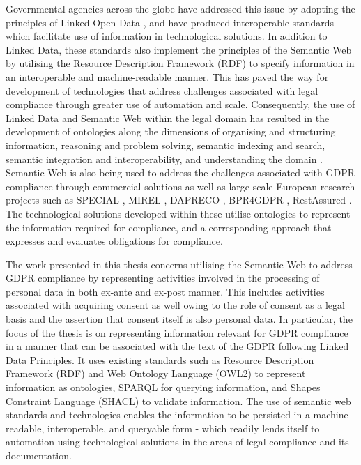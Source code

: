 Governmental agencies across the globe have addressed this issue by adopting the principles of Linked Open Data \cite{bizer_linked_2011}, and have produced interoperable standards \cite{palmirani_akoma_2018,european_union_eli_2015,van_opijnen_european_2011} which facilitate use of information in technological solutions.
In addition to Linked Data, these standards also implement the principles of the Semantic Web \cite{semantic-web} by utilising the Resource Description Framework (RDF) \cite{RDF} to specify information in an interoperable and machine-readable manner.
This has paved the way for development of technologies that address challenges associated with legal compliance through greater use of automation and scale.
Consequently, the use of Linked Data and Semantic Web within the legal domain has resulted in the development of ontologies along the dimensions of organising and structuring information, reasoning and problem solving, semantic indexing and search, semantic integration and interoperability, and understanding the domain \cite{rodrigues_legal_2019}.
Semantic Web is also being used to address the challenges associated with GDPR compliance through commercial solutions as well as large-scale European research projects such as SPECIAL \cite{SPECIAL}, MIREL \cite{MIREL}, DAPRECO \cite{DAPRECO}, BPR4GDPR \cite{BPR4GDPR}, RestAssured \cite{RestAssured}.
The technological solutions developed within these utilise ontologies to represent the information required for compliance, and a corresponding approach that expresses and evaluates obligations for compliance.

The work presented in this thesis concerns utilising the Semantic Web to address GDPR compliance by representing activities involved in the processing of personal data in both ex-ante and ex-post manner.
This includes activities associated with acquiring consent as well owing to the role of consent as a legal basis and the assertion that consent itself is also personal data.
In particular, the focus of the thesis is on representing information relevant for GDPR compliance in a manner that can be associated with the text of the GDPR following Linked Data Principles.
It uses existing standards such as Resource Description Framework (RDF) \cite{RDF} and Web Ontology Language (OWL2) \cite{OWL} to represent information as ontologies, SPARQL \cite{SPARQL} for querying information, and Shapes Constraint Language (SHACL) \cite{SHACL} to validate information.
The use of semantic web standards and technologies enables the information to be persisted in a machine-readable, interoperable, and queryable form - which readily lends itself to automation using technological solutions in the areas of legal compliance and its documentation.

